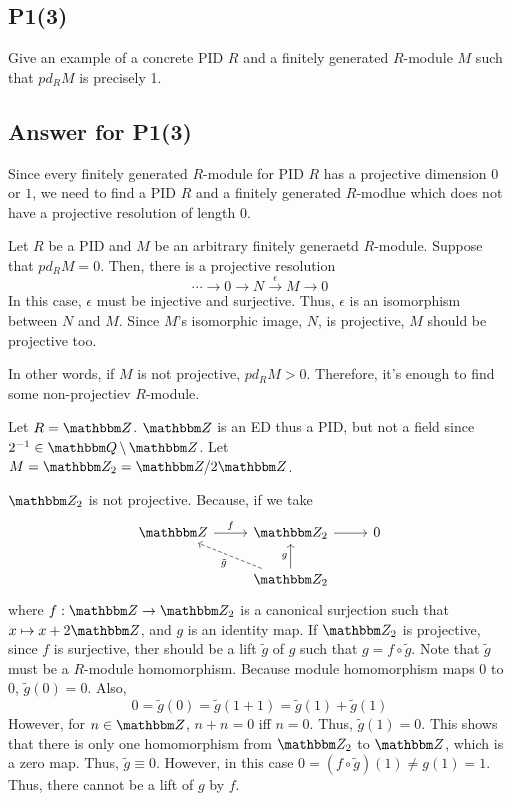 \subsection*{P1(3)}
Give an example of a concrete PID \(R\)
and a finitely generated \(R\)-module
\(M\) such that \(pd_R M\) is precisely 1.

\subsection*{Answer for P1(3)}

Since every finitely generated \(R\)-module for PID \(R\) has a projective dimension \(0\) or \(1\),
we need to find a PID \(R\) and a finitely generated \(R\)-modlue
which does not have a projective resolution of length 0.

Let \(R\) be a PID and \(M\) be an arbitrary finitely generaetd \(R\)-module.
Suppose that \(pd_R M = 0\).
Then, there is a projective resolution
\[\cdots \to 0 \to N \xrightarrow{\epsilon} M \to 0\]
In this case, \(\epsilon\) must be injective and surjective.
Thus, \(\epsilon\) is an isomorphism between \(N\) and \(M\).
Since \(M\)'s isomorphic image, \(N\), is projective,
\(M\) should be projective too.

In other words, if \(M\) is not projective,
\(pd_R M > 0\).
Therefore, it's enough to find some non-projectiev \(R\)-module.

Let \(R = \bbZ\).
\(\bbZ\) is an ED thus a PID, but not a field since \(2^{-1} \in \bbQ \bs \bbZ\).
Let \(M = \bbZ_2 = \bbZ / 2\bbZ\).

\(\bbZ_2\) is not projective.
Because, if we take
\[\begin{tikzcd}
  \bbZ \ar["f"]{r} & \bbZ_2 \ar{r} & 0
  \\
  & \bbZ_2 \ar[dashed, "\tilde g"]{ul} \ar["g"]{u}
\end{tikzcd}\]
where \(f: \bbZ \to \bbZ_2\) is a canonical surjection such that \(x \mapsto x + 2\bbZ\),
and \(g\) is an identity map.
If \(\bbZ_2\) is projective, since \(f\) is surjective,
ther should be a lift \(\tilde g\) of \(g\)
such that \(g = f \circ \tilde g\).
Note that \(\tilde g\) must be a \(R\)-module homomorphism.
Because module homomorphism maps \(0\) to \(0\),
\(\tilde g(0) = 0\).
Also,
\[0 = \tilde g(0) = \tilde g(1 + 1) = \tilde g(1) + \tilde g(1)\]
However, for \(n \in \bbZ\), \(n + n = 0\) iff \(n = 0\).
Thus, \(\tilde g(1) = 0\).
This shows that there is only one homomorphism from \(\bbZ_2\) to \(\bbZ\),
which is a zero map.
Thus, \(\tilde g \equiv 0\).
However, in this case
\(0 = (f \circ \tilde g)(1) \neq g(1) = 1\).
Thus, there cannot be a lift of \(g\) by \(f\).

